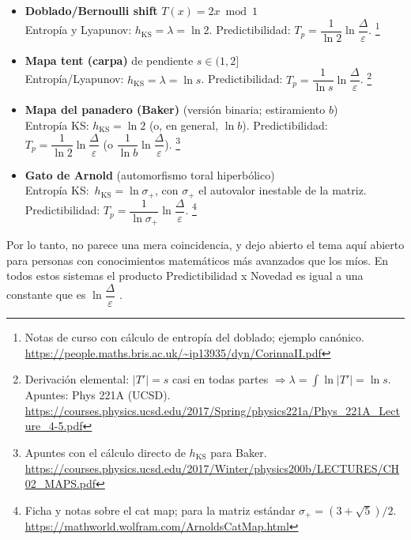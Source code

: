 \documentclass[
  10pt,
  a4paper,
  DIV=11,
  numbers=noendperiod,
  open=any]{scrreprt}
\numberwithin{equation}{chapter}
\numberwithin{equation}{section}
\renewcommand{\[}{\begin{equation}}
\renewcommand{\]}{\end{equation}}
\begin{document}
\begin{itemize}
  \item \textbf{Doblado/Bernoulli shift} $T(x)=2x \bmod 1$\\
  Entropía y Lyapunov: $h_{\mathrm{KS}}=\lambda=\ln 2$. \quad
  Predictibilidad: $T_p=\dfrac{1}{\ln 2}\ln\dfrac{\Delta}{\varepsilon}$.%
  \footnote{Notas de curso con cálculo de entropía del doblado; ejemplo canónico. \url{https://people.maths.bris.ac.uk/~ip13935/dyn/CorinnaII.pdf}}
  
  \item \textbf{Mapa tent (carpa)} de pendiente $s\in(1,2]$\\
  Entropía/Lyapunov: $h_{\mathrm{KS}}=\lambda=\ln s$. \quad
  Predictibilidad: $T_p=\dfrac{1}{\ln s}\ln\dfrac{\Delta}{\varepsilon}$.%
  \footnote{Derivación elemental: $|T'|=s$ casi en todas partes $\Rightarrow \lambda=\int \ln|T'|=\ln s$. Apuntes: Phys 221A (UCSD). \url{https://courses.physics.ucsd.edu/2017/Spring/physics221a/Phys_221A_Lecture_4-5.pdf}}

  \item \textbf{Mapa del panadero (Baker)} (versión binaria; estiramiento $b$)\\
  Entropía KS: $h_{\mathrm{KS}}=\ln 2$ (o, en general, $\ln b$). \quad
  Predictibilidad: $T_p=\dfrac{1}{\ln 2}\ln\dfrac{\Delta}{\varepsilon}$ (o $\dfrac{1}{\ln b}\ln\dfrac{\Delta}{\varepsilon}$).%
  \footnote{Apuntes con el cálculo directo de $h_{\mathrm{KS}}$ para Baker. \url{https://courses.physics.ucsd.edu/2017/Winter/physics200b/LECTURES/CH02_MAPS.pdf}}

  \item \textbf{Gato de Arnold} (automorfismo toral hiperbólico)\\
  Entropía KS: $\,h_{\mathrm{KS}}=\ln \sigma_{+}$, con $\sigma_{+}$ el autovalor inestable de la matriz. \quad
  Predictibilidad: $T_p=\dfrac{1}{\ln\sigma_{+}}\ln\dfrac{\Delta}{\varepsilon}$.%
  \footnote{Ficha y notas sobre el cat map; para la matriz estándar $\sigma_{+}=(3+\sqrt{5})/2$. \url{https://mathworld.wolfram.com/ArnoldsCatMap.html}}
\end{itemize}


Por lo tanto, no parece una mera coincidencia, y dejo abierto el tema aquí abierto para personas con conocimientos matemáticos más avanzados que los míos. En todos estos sistemas el producto Predictibilidad x Novedad es igual a una constante que es $\ln\dfrac{\Delta}{\varepsilon}$ . 


\end{document}
